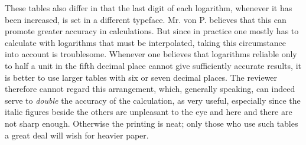 These tables also differ in that the last digit of each logarithm, whenever it has been increased, is set in a different typeface. Mr. von P. believes that this can promote greater accuracy in calculations. But since in practice one mostly has to calculate with logarithms that must be interpolated, taking this circumstance into account is troublesome. Whenever one believes that logarithms reliable only to half a unit in the fifth decimal place cannot give sufficiently accurate results, it is better to use larger tables with six or seven decimal places. The reviewer therefore cannot regard this arrangement, which, generally speaking, can indeed serve to 
\emph{double} the accuracy of the calculation, as very useful, especially since the italic figures beside the others are unpleasant to the eye and here and there are not sharp enough. Otherwise the printing is neat; only those who use such tables a great deal will wish for heavier paper.

